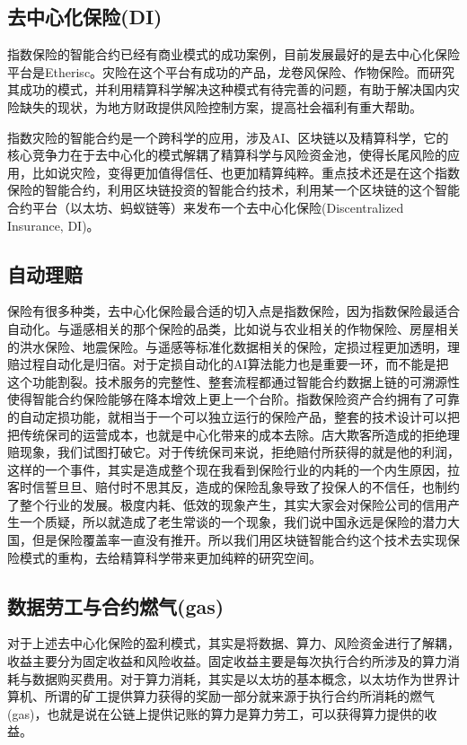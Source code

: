 \documentclass{ctexart}
\begin{document}
\subsection{去中心化保险(DI)}

指数保险的智能合约已经有商业模式的成功案例，目前发展最好的是去中心化保险平台是Etherisc。灾险在这个平台有成功的产品，龙卷风保险、作物保险。而研究其成功的模式，并利用精算科学解决这种模式有待完善的问题，有助于解决国内灾险缺失的现状，为地方财政提供风险控制方案，提高社会福利有重大帮助。

指数灾险的智能合约是一个跨科学的应用，涉及AI、区块链以及精算科学，它的核心竞争力在于去中心化的模式解耦了精算科学与风险资金池，使得长尾风险的应用，比如说灾险，变得更加值得信任、也更加精算纯粹。重点技术还是在这个指数保险的智能合约，利用区块链投资的智能合约技术，利用某一个区块链的这个智能合约平台（以太坊、蚂蚁链等）来发布一个去中心化保险(Discentralized Insurance, DI)。



\subsection{自动理赔}


保险有很多种类，去中心化保险最合适的切入点是指数保险，因为指数保险最适合自动化。与遥感相关的那个保险的品类，比如说与农业相关的作物保险、房屋相关的洪水保险、地震保险。与遥感等标准化数据相关的保险，定损过程更加透明，理赔过程自动化是归宿。对于定损自动化的AI算法能力也是重要一环，而不能是把这个功能割裂。技术服务的完整性、整套流程都通过智能合约数据上链的可溯源性使得智能合约保险能够在降本增效上更上一个台阶。指数保险资产合约拥有了可靠的自动定损功能，就相当于一个可以独立运行的保险产品，整套的技术设计可以把把传统保司的运营成本，也就是中心化带来的成本去除。店大欺客所造成的拒绝理赔现象，我们试图打破它。对于传统保司来说，拒绝赔付所获得的就是他的利润，这样的一个事件，其实是造成整个现在我看到保险行业的内耗的一个内生原因，拉客时信誓旦旦、赔付时不思其反，造成的保险乱象导致了投保人的不信任，也制约了整个行业的发展。极度内耗、低效的现象产生，其实大家会对保险公司的信用产生一个质疑，所以就造成了老生常谈的一个现象，我们说中国永远是保险的潜力大国，但是保险覆盖率一直没有推开。所以我们用区块链智能合约这个技术去实现保险模式的重构，去给精算科学带来更加纯粹的研究空间。

\subsection{数据劳工与合约燃气(gas)}

对于上述去中心化保险的盈利模式，其实是将数据、算力、风险资金进行了解耦，收益主要分为固定收益和风险收益。固定收益主要是每次执行合约所涉及的算力消耗与数据购买费用。对于算力消耗，其实是以太坊的基本概念，以太坊作为世界计算机、所谓的矿工提供算力获得的奖励一部分就来源于执行合约所消耗的燃气(gas)，也就是说在公链上提供记账的算力是算力劳工，可以获得算力提供的收益。
\end{document}
